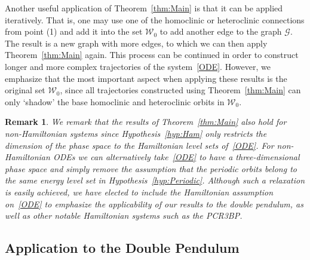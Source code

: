 \documentclass[11pt]{article}
\newcommand{\W}{\mathcal{W}}
\numberwithin{equation}{section}
\theoremstyle{plain}
\newtheorem{rmk}[theorem]{Remark}
\begin{document}
Another useful application of Theorem~\ref{thm:Main} is that it can be applied iteratively. That is, one may use one of the homoclinic or heteroclinic connections from point (1) and add it into the set $\W_0$ to add another edge to the graph $\mathcal{G}$. The result is a new graph with more edges, to which we can then apply Theorem~\ref{thm:Main} again. This process can be continued in order to construct longer and more complex trajectories of the system~\eqref{ODE}. However, we emphasize that the most important aspect when applying these results is the original set $\W_0$, since all trajectories constructed using Theorem~\ref{thm:Main} can only `shadow' the base homoclinic and heteroclinic orbits in $\W_0$. 

\begin{rmk}
We remark that the results of Theorem~\ref{thm:Main} also hold for non-Hamiltonian systems since Hypothesis~\ref{hyp:Ham} only restricts the dimension of the phase space to the Hamiltonian level sets of~\eqref{ODE}. For non-Hamiltonian ODEs we can alternatively take~\eqref{ODE} to have a three-dimensional phase space and simply remove the assumption that the periodic orbits belong to the same energy level set in Hypothesis~\ref{hyp:Periodic}. Although such a relaxation is easily achieved, we have elected to include the Hamiltonian assumption on~\eqref{ODE} to emphasize the applicability of our results to the double pendulum, as well as other notable Hamiltonian systems such as the PCR3BP. 
\end{rmk}






\subsection{Application to the Double Pendulum}\label{subsec:DPapplication}
\end{document}
